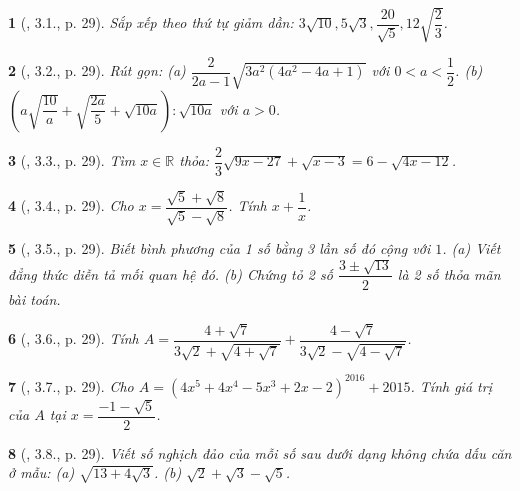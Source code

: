 \documentclass{article}
\newtheorem{baitoan}{}
\begin{document}
\begin{baitoan}[\cite{Binh_boi_duong_Toan_9_tap_1}, 3.1., p. 29]
	Sắp xếp theo thứ tự giảm dần: $3\sqrt{10},5\sqrt{3},\dfrac{20}{\sqrt{5}},12\sqrt{\dfrac{2}{3}}$.
\end{baitoan}

\begin{baitoan}[\cite{Binh_boi_duong_Toan_9_tap_1}, 3.2., p. 29]
	Rút gọn: (a) $\dfrac{2}{2a - 1}\sqrt{3a^2(4a^2 - 4a + 1)}$ với $0 < a < \dfrac{1}{2}$. (b) $\left(a\sqrt{\dfrac{10}{a}} + \sqrt{\dfrac{2a}{5}} + \sqrt{10a}\right):\sqrt{10a}$ với $a > 0$.
\end{baitoan}

\begin{baitoan}[\cite{Binh_boi_duong_Toan_9_tap_1}, 3.3., p. 29]
	Tìm $x\in\mathbb{R}$ thỏa: $\dfrac{2}{3}\sqrt{9x - 27} + \sqrt{x - 3} = 6 - \sqrt{4x - 12}$.
\end{baitoan}

\begin{baitoan}[\cite{Binh_boi_duong_Toan_9_tap_1}, 3.4., p. 29]
	Cho $x = \dfrac{\sqrt{5} + \sqrt{8}}{\sqrt{5} - \sqrt{8}}$. Tính $x + \dfrac{1}{x}$.
\end{baitoan}

\begin{baitoan}[\cite{Binh_boi_duong_Toan_9_tap_1}, 3.5., p. 29]
	Biết bình phương của 1 số bằng 3 lần số đó cộng với $1$. (a) Viết đẳng thức diễn tả mối quan hệ đó. (b) Chứng tỏ 2 số $\dfrac{3\pm\sqrt{13}}{2}$ là 2 số thỏa mãn bài toán.
\end{baitoan}

\begin{baitoan}[\cite{Binh_boi_duong_Toan_9_tap_1}, 3.6., p. 29]
	Tính $A = \dfrac{4 + \sqrt{7}}{3\sqrt{2} + \sqrt{4 + \sqrt{7}}} + \dfrac{4 - \sqrt{7}}{3\sqrt{2} - \sqrt{4 - \sqrt{7}}}$.
\end{baitoan}

\begin{baitoan}[\cite{Binh_boi_duong_Toan_9_tap_1}, 3.7., p. 29]
	Cho $A = (4x^5 + 4x^4 - 5x^3 + 2x - 2)^{2016} + 2015$. Tính giá trị của $A$ tại $x = \dfrac{-1 - \sqrt{5}}{2}$.
\end{baitoan}

\begin{baitoan}[\cite{Binh_boi_duong_Toan_9_tap_1}, 3.8., p. 29]
	Viết số nghịch đảo của mỗi số sau dưới dạng không chứa dấu căn ở mẫu: (a) $\sqrt{13 + 4\sqrt{3}}$. (b) $\sqrt{2} + \sqrt{3} - \sqrt{5}$.
\end{baitoan}
\end{document}
